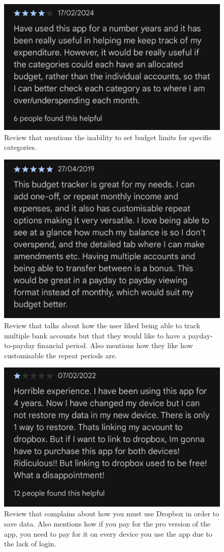 \documentclass{l4proj}
\begin{document}
\begin{appendices}
\begin{figure}[H]
    \centering
    \includegraphics[width=0.5\linewidth]{images/App-Comparison/spending-tracker-review-4.png}
    \caption{Review that mentions the inability to set budget limits for specific categories.}
    \label{fig:enter-label}
\end{figure}
\begin{figure}[H]
    \centering
    \includegraphics[width=0.5\linewidth]{images/App-Comparison/spending-tracker-review-5.png}
    \caption{Review that talks about how the user liked being able to track multiple bank accounts but that they would like to have a payday-to-payday financial period. Also mentions how they like how customisable the repeat periods are.}
    \label{fig:enter-label}
\end{figure}
\begin{figure}[H]
    \centering
    \includegraphics[width=0.5\linewidth]{images/App-Comparison/spending-tracker-review-6.png}
    \caption{Review that complains about how you must use Dropbox in order to save data. Also mentions how if you pay for the pro version of the app, you need to pay for it on every device you use the app due to the lack of login.}
    \label{fig:enter-label}

\end{figure}
\end{appendices}
\end{document}
